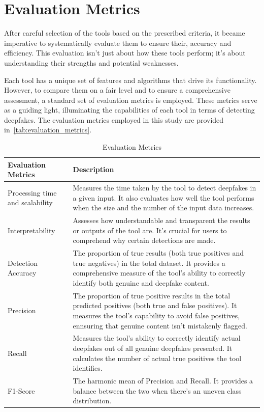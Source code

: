 \section{Evaluation Metrics}
After careful selection of the tools based on the prescribed criteria, it became
imperative to systematically evaluate them to ensure their, accuracy
and efficiency. This evaluation isn't just about how these tools perform; it's
about understanding their strengths and potential weaknesses.

Each tool has a unique set of features and algorithms that drive its functionality.
However, to compare them on a fair level and to ensure a comprehensive
assessment, a standard set of evaluation metrics is employed. These metrics serve
as a guiding light, illuminating the capabilities of each tool in terms of
detecting deepfakes. The evaluation metrics employed in this study are provided in~\autoref{tab:evaluation_metrics}.

\begin{table}[htpb]
	\caption{Evaluation Metrics}\label{tab:evaluation_metrics}
	\centering
	\small
	\begin{tabularx}{\textwidth}{l X}
		\toprule
		\textbf{Evaluation Metrics}     & \textbf{Description}                                 \\
		\midrule
		Processing time and scalability & Measures the time taken by the tool to detect
		deepfakes in a given input. It also evaluates how well the tool performs
		when the size and the number of the input data increases.                              \\
		\addlinespace
		Interpretability                & Assesses how understandable and transparent
		the results or outputs of the tool are. It's crucial for users to comprehend
		why certain detections are made.                                                       \\
		\addlinespace
		Detection Accuracy              & The proportion of true results (both true
		positives and true negatives) in the total dataset. It provides a comprehensive
		measure of the tool's ability to correctly identify both genuine and deepfake content. \\
		\addlinespace
		Precision                       & The proportion of true positive results in the
		total predicted positives (both true and false positives). It measures the tool's capability to avoid false positives,
		ennsuring that genuine content isn't mistakenly flagged.                               \\
		\addlinespace
		Recall                          & Measures the tool's ability to correctly
		identify actual deepfakes out of all genuine deepfakes presented. It calculates the
		number of actual true positives the tool identifies.                                   \\
		\addlinespace
		F1-Score                        & The harmonic mean of Precision and Recall.
		It provides a balance between the two when there's an uneven class distribution.       \\
		\bottomrule
	\end{tabularx}
\end{table}

